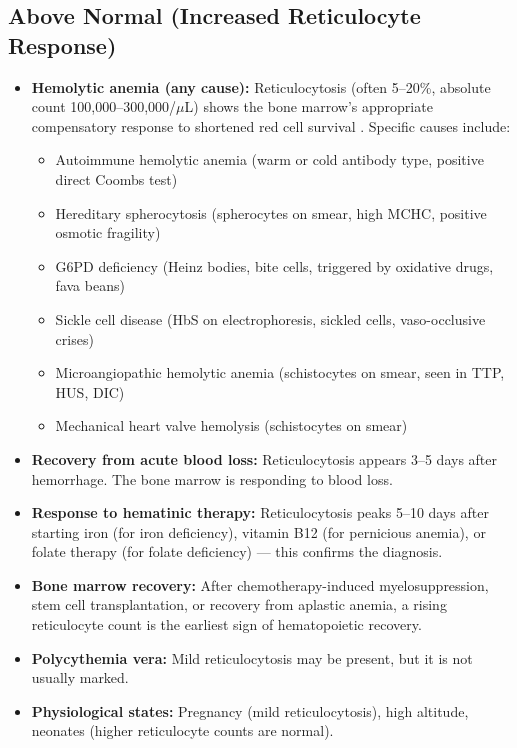 \subsection*{Above Normal (Increased Reticulocyte Response)}
\begin{itemize}
  \item \textbf{Hemolytic anemia (any cause):} Reticulocytosis (often 5--20\%, absolute count 100,000--300,000/$\mu$L) shows the bone marrow's appropriate compensatory response to shortened red cell survival \cite{kaushansky2021williams}. Specific causes include:
  \begin{itemize}
    \item Autoimmune hemolytic anemia (warm or cold antibody type, positive direct Coombs test)
    \item Hereditary spherocytosis (spherocytes on smear, high MCHC, positive osmotic fragility)
    \item G6PD deficiency (Heinz bodies, bite cells, triggered by oxidative drugs, fava beans)
    \item Sickle cell disease (HbS on electrophoresis, sickled cells, vaso-occlusive crises)
    \item Microangiopathic hemolytic anemia (schistocytes on smear, seen in TTP, HUS, DIC)
    \item Mechanical heart valve hemolysis (schistocytes on smear)
  \end{itemize}
  \item \textbf{Recovery from acute blood loss:} Reticulocytosis appears 3--5 days after hemorrhage. The bone marrow is responding to blood loss.
  \item \textbf{Response to hematinic therapy:} Reticulocytosis peaks 5--10 days after starting iron (for iron deficiency), vitamin B12 (for pernicious anemia), or folate therapy (for folate deficiency) --- this confirms the diagnosis.
  \item \textbf{Bone marrow recovery:} After chemotherapy-induced myelosuppression, stem cell transplantation, or recovery from aplastic anemia, a rising reticulocyte count is the earliest sign of hematopoietic recovery.
  \item \textbf{Polycythemia vera:} Mild reticulocytosis may be present, but it is not usually marked.
  \item \textbf{Physiological states:} Pregnancy (mild reticulocytosis), high altitude, neonates (higher reticulocyte counts are normal).
\end{itemize}

